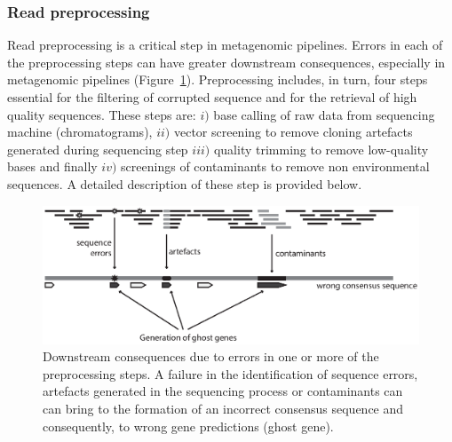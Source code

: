 \subsubsection{Read preprocessing}
Read preprocessing is a critical step in metagenomic pipelines. Errors in each of the preprocessing steps can have greater downstream consequences, especially in metagenomic pipelines (Figure~\ref{fig:errors}). Preprocessing includes, in turn, four steps essential for the filtering of corrupted sequence and for the retrieval of high quality sequences. These steps are: $i)$ base calling of raw data from sequencing machine (chromatograms), $ii)$ vector screening to remove cloning artefacts generated during sequencing step $iii)$ quality trimming to remove low-quality bases and finally $iv)$ screenings of contaminants to remove non environmental sequences. A detailed description of these step is provided below.\\

\begin{figure}[!tb]
	\centering
	\includegraphics[width=1\textwidth]{./figures/Introduction/errors}
  	\caption{Downstream consequences due to errors in one or more of the preprocessing steps. A failure in the identification of sequence errors, artefacts generated in the sequencing process or contaminants can can bring to the formation of an incorrect consensus sequence and consequently, to wrong gene predictions (ghost gene). \label{fig:errors}}
\end{figure}

